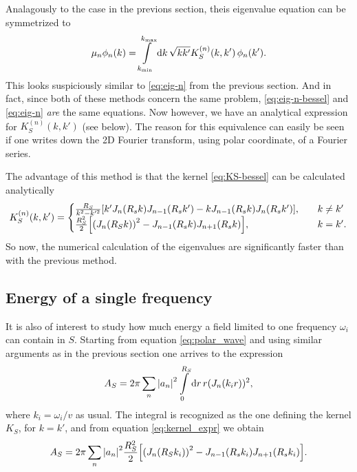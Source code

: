 \documentclass[11pt,a4paper, 
swedish,english %
]{article}
\begin{document}
Analagously to the case in the previons section, theis eigenvalue
equation can be symmetrized to
\begin{equation}\label{eq:eig-n-bessel}
\mu_n\phi_n(k) = \int_{k_{\min}}^{{k_{\max}}}\rd{k}\,
\sqrt{kk'} K_S^{(n)}(k, k')\,\phi_n(k').
\end{equation}
This looks suspiciously similar to \eqref{eq:eig-n} from the previous section. And in fact, since both of these methods concern the same problem, \eqref{eq:eig-n-bessel} and \eqref{eq:eig-n} \emph{are} the same equations. Now however, we have an analytical expression for $K_S^{(n)}(k, k')$ (see below). The reason for this equivalence can easily be seen if one writes down the 2D Fourier transform, using polar coordinate, of a Fourier series. 

The advantage of this method is that the kernel
\eqref{eq:KS-bessel} can be calculated analytically
\cite[formula 5.54]{Gradshteyn-Ryzhik}
\begin{equation}\label{eq:kernel_expr}
K_S^{(n)}(k, k') =
\begin{cases}
\frac{R_S}{k^2-k'^2}
\qty[k'J_{n}(R_sk)J_{n-1}(R_sk')-kJ_{n-1}(R_sk)J_{n}(R_sk')]
\qc &k\neq k'\\
\frac{R_S^2}{2}\qty[ \qty(J_{n}(R_Sk))^2
-J_{n-1}(R_sk)J_{n+1}(R_sk)]
\qc &k= k'.
\end{cases}
\end{equation}
So now, the numerical calculation of the eigenvalues are significantly
faster than with the previous method.


\subsection{Energy of a single frequency}
It is also of interest to study how much energy a field limited to one frequency
$\omega_i$ can contain in $S$. Starting from equation \eqref{eq:polar_wave}
and using similar arguments as in the previous section one arrives to the expression
\begin{equation}
A_S=2\pi\sum_n \abs{a_n}^2\int_0^{R_S}\rd r \, r (J_n(k_ir))^2,
\end{equation}
where $k_i={\omega_i}/{v}$ as usual.
The integral is recognized as the one defining the kernel $K_S$, for $k=k'$, and from equation \eqref{eq:kernel_expr} we obtain
\begin{equation}\label{eq:energy_single}
A_S=2\pi \sum_n \abs{a_n}^2\frac{R_S^2}{2}\qty[ \qty(J_{n}(R_Sk_i))^2
-J_{n-1}(R_sk_i)J_{n+1}(R_sk_i)].
  \end{equation}
\end{document}
